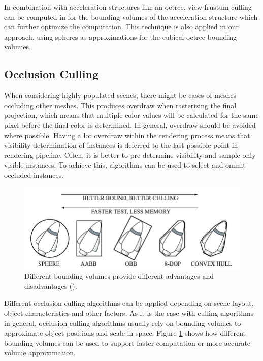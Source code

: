 \noindent
In combination with acceleration structures like an octree, view frustum culling can be computed in for the bounding volumes of the 
acceleration structure which can further optimize the computation. This technique is also applied in our approach, using spheres as 
approximations for the cubical octree bounding volumes.

\subsection{Occlusion Culling} \label{subsec-point-based-occlusion-culling}

When considering highly populated scenes, there might be cases of meshes occluding other meshes. This produces overdraw when rasterizing 
the final projection, which means that multiple color values will be calculated for the same pixel before the final color is determined. 
In general, overdraw should be avoided where possible. Having a lot overdraw within the rendering process means that visibility determination 
of instances is deferred to the last possible point in rendering pipeline. Often, it is better to pre-determine visibility and sample only 
visible instances. To achieve this, algorithms can be used to select and ommit occluded instances. \\

\begin{figure}[h]
    \centering
    \includegraphics[width=\linewidth]{images/graphics/bounding-volume-quality.png}
    \caption{Different bounding volumes provide different advantages and disadvantages (\cite{Six2021}).}
    \label{fig:bounding-volumes}
\end{figure}

\noindent
Different occlusion culling algorithms can be applied depending on scene layout, object characteristics and other factors.
As it is the case with culling algorithms in general, occlusion culling algorithms usually rely on bounding volumes to approximate object 
positions and scale in space. Figure \ref{fig:bounding-volumes} shows how different bounding volumes can be used to support faster computation 
or more accurate volume approximation. 

